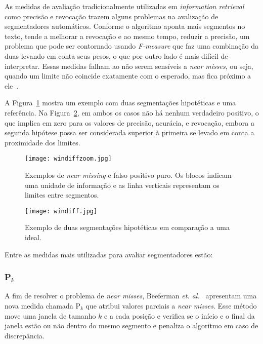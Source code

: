 	As medidas de avaliação tradicionalmente utilizadas em \textit{information retrieval} como precisão e revocação trazem alguns problemas na avalização de segmentadores automáticos.  
Conforme o algoritmo aponta mais segmentos no texto, tende a melhorar a revocação e ao mesmo tempo, reduzir a precisão, um problema que pode ser contornado usando \textit{F-measure} que faz uma combinação da duas levando em conta seus pesos, o que por outro lado é mais difícil de interpretar. 
Essas medidas falham ao não serem sensíveis a \textit{near misses}, ou seja, quando um limite não coincide exatamente com o esperado, mas fica próximo a ele~\cite{Kern2009}.

A Figura~\ref{fig:exemplosegmentacaozoom} mostra um exemplo com duas segmentações hipotéticas e uma referência. Na Figura~\ref{fig:exemplosegmentacao}, em ambos os casos não há nenhum verdadeiro positivo, o que implica em zero para os valores de precisão, acurácia, e revocação, embora a segunda hipótese possa ser considerada superior à primeira se levado em conta a proximidade dos limites.



  \begin{figure}[!h]

	\centering
	\texttt{[image: windiffzoom.jpg]}
	\caption{Exemplos de \textit{near missing} e falso positivo puro. Os blocos indicam uma unidade de informação e as linha verticais representam os limites entre segmentos. }
	\label{fig:exemplosegmentacaozoom}

  \end{figure}
  
  \begin{figure}[!h]

	\centering
	\texttt{[image: windiff.jpg]}
	\caption{
	Exemplo de duas segmentações hipotéticas em comparação a uma ideal. 
	}
	\label{fig:exemplosegmentacao}

  \end{figure}
  
  
Entre as medidas mais utilizadas para avaliar segmentadores estão:

\subsubsection{P$_k$}
A fim de resolver o problema de \textit{near misses}, Beeferman \textit{et. al.}~\cite{Beeferman1999} apresentam uma nova medida chamada P$_k$ que atribui valores parciais a \textit{near misses}. Esse método move uma janela de tamanho $k$ e a cada posição e verifica se o início e o final da janela estão ou não dentro do mesmo segmento e penaliza o algoritmo em caso de discrepância. 

